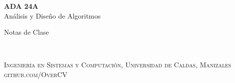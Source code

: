 \documentclass[tikz,11pt,fleqn]{book} %
\begin{document}
\newcommand{\floor}[1]{\left\lfloor #1 \right\rfloor}
\newcommand{\ceil}[1]{\left\lceil #1 \right\rceil}
\newcommand{\br}[1]{\left( #1 \right)}




\begingroup
\thispagestyle{empty}
\centering
\vspace*{5cm}
\par\normalfont\fontsize{35}{35}\sffamily\selectfont
\textbf{ADA 24A}\\
{\LARGE Análisis y Diseño de Algoritmos}\par %
\vspace*{1cm}
{\Huge Notas de Clase}\par %
\endgroup


\newpage
~\vfill
\thispagestyle{empty}


\noindent \textsc{Ingeniería en Sistemas y Computación, Universidad de Caldas, Manizales}\\

\noindent \textsc{github.com/OverCV}\\ %
\end{document}
